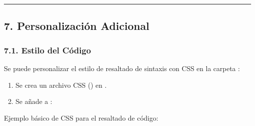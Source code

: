 \documentclass[a4paper,10pt,oneside,spanish,openany]{sphinxmanual}
\begin{document}
\begin{sphinxVerbatim}[commandchars=\\\{\}]
 \PYGZbs{}\PYGZbs{}\PYGZbs{}
\end{sphinxVerbatim}


\bigskip\hrule\bigskip



\subsection{7. Personalización Adicional}
\label{\detokenize{configuracion_inicial/003.Creacion_proyecto_Sphinx:personalizacion-adicional}}

\subsubsection{7.1. Estilo del Código}
\label{\detokenize{configuracion_inicial/003.Creacion_proyecto_Sphinx:estilo-del-codigo}}
\sphinxAtStartPar
Se puede personalizar el estilo de resaltado de sintaxis con CSS en la carpeta :
\begin{enumerate}
%
\item {} 
\sphinxAtStartPar
Se crea un archivo CSS () en .

\item {} 
\sphinxAtStartPar
Se añade a :

\end{enumerate}

\begin{sphinxVerbatim}[commandchars=\\\{\}]
  \PYG{p}{[}\PYG{p}{]}
\end{sphinxVerbatim}

\sphinxAtStartPar
Ejemplo básico de CSS para el resaltado de código:

\begin{sphinxVerbatim}[commandchars=\\\{\}]
 
     
     
     
     
     
       
\end{sphinxVerbatim}
\end{document}
